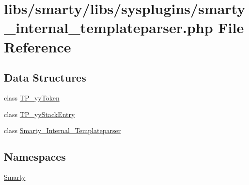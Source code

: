 \hypertarget{smarty__internal__templateparser_8php}{}\section{libs/smarty/libs/sysplugins/smarty\+\_\+internal\+\_\+templateparser.php File Reference}
\label{smarty__internal__templateparser_8php}
\subsection*{Data Structures}
\begin{DoxyCompactItemize}
\item 
class \hyperlink{class_t_p__yy_token}{T\+P\+\_\+yy\+Token}
\item 
class \hyperlink{class_t_p__yy_stack_entry}{T\+P\+\_\+yy\+Stack\+Entry}
\item 
class \hyperlink{class_smarty___internal___templateparser}{Smarty\+\_\+\+Internal\+\_\+\+Templateparser}
\end{DoxyCompactItemize}
\subsection*{Namespaces}
\begin{DoxyCompactItemize}
\item 
 \hyperlink{namespace_smarty}{Smarty}
\end{DoxyCompactItemize}
